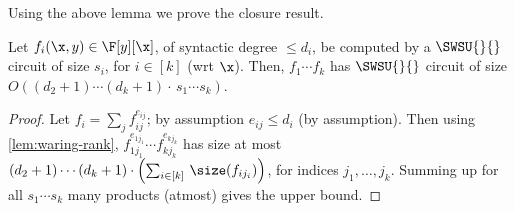 Using the above lemma we prove the closure result.

\begin{lemma}\label{lem:prod-swsw}
Let $f_i(\x,y) \in \F[y][\x]$, of syntactic degree $\le d_i$, be computed by a $\SWSU{}{}$ circuit of size $s_i$, for $i \in [k]$ (wrt $\x$). Then, $f_1 \cdots f_k$ has $\SWSU{}{}$ circuit of size $O((d_2+1) \cdots (d_k+1)\cdot\,s_1\cdots s_k)$.
\end{lemma}

\begin{proof}
Let $f_i=\sum_{j} f_{ij}^{e_{ij}}$; by assumption $e_{ij} \le d_i$ (by assumption). Then using \autoref{lem:waring-rank}, $f_{1j_1}^{e_{1j_1}} \cdots f_{kj_k}^{e_{kj_k}}$ has size at most $(d_2+1) \cdots (d_k+1) \cdot \left(\sum_{i \in [k]}\,\size(f_{ij_i})\right)$, for indices $j_1,\hdots, j_k$. Summing up for all $s_1 \cdots s_k$ many products (atmost) gives the upper bound.
\end{proof}
